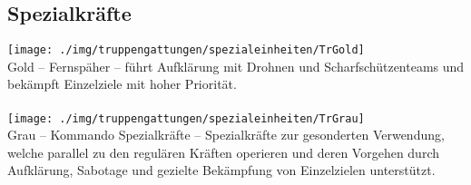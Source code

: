 \subsection{Spezialkräfte}
\texttt{[image: ./img/truppengattungen/spezialeinheiten/TrGold]}\\
Gold -- Fernspäher -- führt Aufklärung mit Drohnen und Scharfschützenteams und bekämpft Einzelziele mit hoher Priorität.\\\\
\texttt{[image: ./img/truppengattungen/spezialeinheiten/TrGrau]}\\
Grau -- Kommando Spezialkräfte -- Spezialkräfte zur gesonderten Verwendung, welche parallel zu den regulären Kräften operieren und deren Vorgehen durch Aufklärung, Sabotage und gezielte Bekämpfung von Einzelzielen unterstützt.
